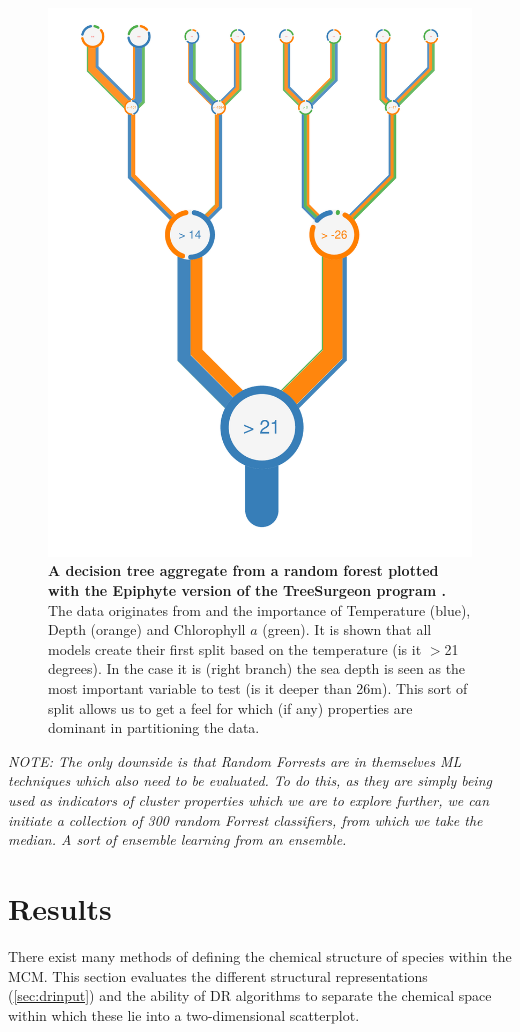\begin{figure}[H]
     \centering
         \includegraphics[width=.55\textwidth]{4fig/Oi_prj_features_of_RFR(TEMP+DEPTH+ChlrA)_for_depth_5_white.pdf}
        \caption{\textbf{A decision tree aggregate from a random forest plotted with the Epiphyte version of the TreeSurgeon program \citep{forrester}.} The data originates from \cite{iodene} and the importance of Temperature (blue), Depth (orange) and Chlorophyll $a$ (green). It is shown that all models create their first split based on the temperature (is it $>$21 degrees). In the case it is (right branch) the sea depth is seen as the most important variable to test (is it deeper than 26m). This sort of split allows us to get a feel for which (if any) properties are dominant in partitioning the data. }
        \label{fig:iodenetree}
\end{figure}


%

\textit{NOTE: The only downside is that Random Forrests are in themselves ML techniques which also need to be evaluated. To do this, as they are simply being used as indicators of cluster properties which we are to explore further, we can initiate a collection of 300 random Forrest classifiers, from which we take the median. A sort of ensemble learning from an ensemble. }


\section{Results}\label{sec:drres}
%
There exist many methods of defining the chemical structure of species within the MCM. This section evaluates the different structural representations (\autoref{sec:drinput}) and the ability of DR algorithms to separate the chemical space within which these lie into a two-dimensional scatterplot.

